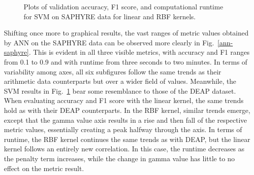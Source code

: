 \documentclass[12pt]{uthesis-v12}  %
\begin{document}
\begin{figure}
	\hfill	
{}
						
\caption{Plots of validation accuracy, F1 score, and computational runtime for SVM on SAPHYRE data for linear and RBF kernels.}
	\label{svm-saphyre}
	\end{figure}
	
Shifting once more to graphical results, the vast ranges of metric values obtained by ANN on the SAPHYRE data can be observed more clearly in Fig.~\ref{ann-saphyre}. This is evident in all three visible metrics, with accuracy and F1 ranges from 0.1 to 0.9 and with runtime from three seconds to two minutes. In terms of variability among axes, all six subfigures follow the same trends as their arithmetic data counterparts but over a wider field of values. Meanwhile, the SVM results in Fig.~\ref{svm-saphyre} bear some resemblance to those of the DEAP dataset. When evaluating accuracy and F1 score with the linear kernel, the same trends hold as with their DEAP counterparts. In the RBF kernel, similar trends emerge, except that the gamma value axis results in a rise and then fall of the respective metric values, essentially creating a peak halfway through the axis. In terms of runtime, the RBF kernel continues the same trends as with DEAP, but the linear kernel follows an entirely new correlation. In this case, the runtime decreases as the penalty term increases, while the change in gamma value has little to no effect on the metric result.
\end{document}
